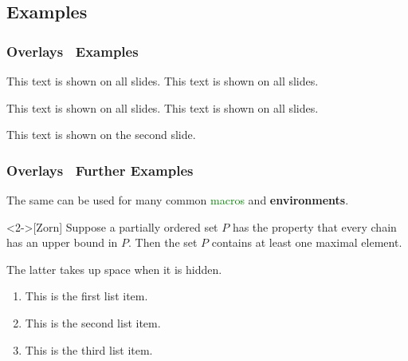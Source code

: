 \documentclass[UKenglish, unknownkeysallowed]{beamer}
\begin{document}
\subsection{Examples}


\begin{frame}
    \frametitle{Overlays \textthreequartersemdash\ Examples}


    This text is shown on all slides.
    This text is shown on all slides.

    \medskip

    This text is shown on all slides.
    This text is shown on all slides.

    \medskip

             {\alert{This text is shown on the second slide.}}
\end{frame}


\begin{frame}
    \frametitle{Overlays \textthreequartersemdash\ Further Examples}

    The same  can be used
    for many \alert<2>{common} \textcolor<1>{green}{macros}
    and \textbf<2>{environments}.

    \begin{lemma}<2->[Zorn]
        Suppose a partially ordered set \(P\) has the property
        that every chain has an upper bound in \(P\).
        Then the set \(P\) contains at least one maximal element.
    \end{lemma}

    The latter takes up space when it is hidden.

    \begin{enumerate}
        \item<1->
        This is the first list item.

        \item<2->
        This is the second list item.

        \item<1->
        This is the third list item.
    \end{enumerate}
\end{frame}
\end{document}
